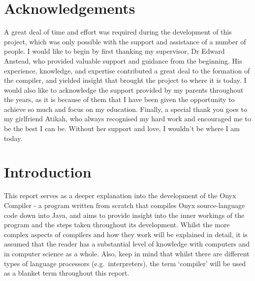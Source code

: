 \documentclass[
]{report}
\begin{document}
\chapter*{Acknowledgements}
A great deal of time and effort was required during the development of
this project, which was only possible with the support and assistance of
a number of people. I would like to begin by first thanking my
supervisor, Dr Edward Anstead, who provided valuable support and
guidance from the beginning. His experience, knowledge, and expertise
contributed a great deal to the formation of the compiler, and yielded
insight that brought the project to where it is today. I would also like
to acknowledge the support provided by my parents throughout the years,
as it is because of them that I have been given the opportunity to
achieve so much and focus on my education. Finally, a special thank you
goes to my girlfriend Atikah, who always recognised my hard work and
encouraged me to be the best I can be. Without her support and love, I
wouldn't be where I am today.

\setcounter{tocdepth}{2}
\tableofcontents

\listoffigures

\chapter{Introduction}
This report serves as a deeper explanation into the development of the
Onyx Compiler - a program written from scratch that compiles Onyx \gls{source-language}
code down into Java, and aims to provide insight into the inner workings
of the program and the steps taken throughout its development. Whilst
the more complex aspects of compilers and how they work will be
explained in detail, it is assumed that the reader has a substantial
level of knowledge with computers and in computer science as a whole.
Also, keep in mind that whilst there are different types of language
processors (e.g.~\glspl{interpreter}), the term `compiler' will be used as a
blanket term throughout this report.
\end{document}
